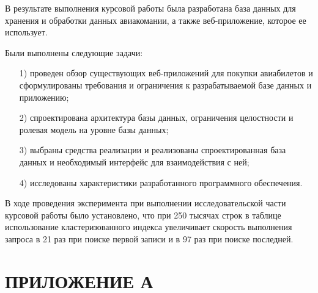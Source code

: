 \documentclass{bmstu}
\begin{document}
В результате выполнения курсовой работы была разработана база данных для хранения и обработки данных авиакомании, а также веб-приложение, которое ее использует.

Были выполнены следующие задачи:

\begin{enumerate}
\item[1)] проведен обзор существующих веб-приложений для покупки авиабилетов и сформулированы требования и ограничения к разрабатываемой базе данных и приложению;
\item[2)] спроектирована архитектура базы данных, ограничения целостности и ролевая модель на уровне базы данных;
\item[3)] выбраны средства реализации и реализованы спроектированная база данных и необходимый интерфейс для взаимодействия с ней;
\item[4)] исследованы характеристики разработанного программного обеспечения.
\end{enumerate}

В ходе проведения эксперимента при выполнении исследовательской части курсовой работы было установлено, что при 250 тысячах строк в таблице использование кластеризованного индекса увеличивает скорость выполнения запроса в 21 раз при поиске первой записи и в 97 раз при поиске последней.

{\centering \printbibliography[title=СПИСОК ИСПОЛЬЗОВАННЫХ ИСТОЧНИКОВ]}

{\centering \chapter*{ПРИЛОЖЕНИЕ А}}
\end{document}
